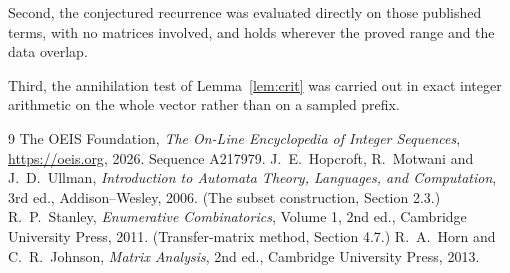 \documentclass[11pt,a4paper]{article}
\theoremstyle{plain}
\theoremstyle{definition}
\begin{document}
Second, the conjectured recurrence was evaluated directly on those published terms, with no
matrices involved, and holds wherever the proved range and the data overlap.

Third, the annihilation test of Lemma~\ref{lem:crit} was carried out in exact integer
arithmetic on the whole vector rather than on a sampled prefix.

\begin{thebibliography}{9}
 The OEIS Foundation, \emph{The On-Line Encyclopedia of Integer
Sequences}, \url{https://oeis.org}, 2026. Sequence A217979.
 J.~E.~Hopcroft, R.~Motwani and J.~D.~Ullman, \emph{Introduction to Automata
Theory, Languages, and Computation}, 3rd ed., Addison--Wesley, 2006. (The subset
construction, Section 2.3.)
 R.~P.~Stanley, \emph{Enumerative Combinatorics}, Volume 1, 2nd ed.,
Cambridge University Press, 2011. (Transfer-matrix method, Section 4.7.)
 R.~A.~Horn and C.~R.~Johnson, \emph{Matrix Analysis}, 2nd ed., Cambridge
University Press, 2013.
\end{thebibliography}
\end{document}
